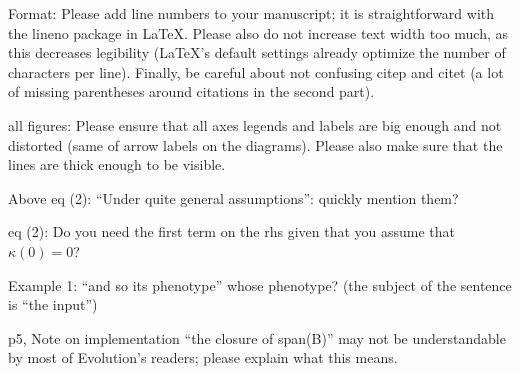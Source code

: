 \begin{point}{Format:}
    Please add line numbers to your manuscript; it is straightforward
with the lineno package in LaTeX.  Please also do not increase text width too
much, as this decreases legibility (LaTeX's default settings already optimize
the number of characters per line).  Finally, be careful about not confusing
citep and citet (a lot of missing parentheses around citations in the second part).
\end{point}


\begin{point}{all figures:}
    Please ensure that all axes legends and labels are big enough
and not distorted (same of arrow labels on the diagrams). Please also make sure
that the lines are thick enough to be visible.
\end{point}

\reply{
}

\begin{point}{Above eq (2):}
    ``Under quite general assumptions'': quickly mention them?
\end{point}


\begin{point}{eq (2):} 
    Do you need the first term on the rhs given that you assume that $\kappa(0)=0$?
\end{point}


\begin{point}{Example 1:}
    ``and so its phenotype'' whose phenotype? (the subject of the sentence is ``the input'')
\end{point}


\begin{point}{p5, Note on implementation}
    ``the closure of span(B)'' may not be
    understandable by most of Evolution's readers; please explain what this means.
\end{point}


